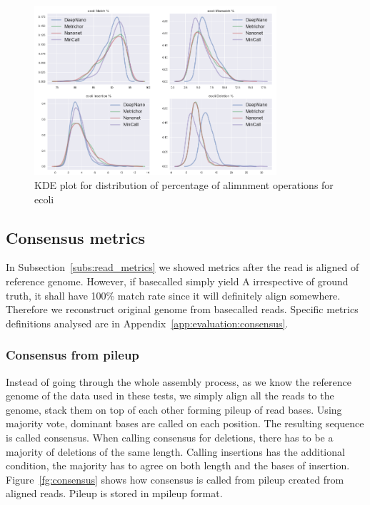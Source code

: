 \documentclass[runningheads,a4paper]{llncs}
\begin{document}
\begin{figure}[]
	\begin{center}
		\includegraphics[width=0.8\textwidth]{./imgs/results/ecoli/kde_cigar.png}
		\caption{KDE plot for distribution of percentage of alimnment operations for ecoli}
		\label{fg:ecoli_kde}
	\end{center}
\end{figure}


\subsection{Consensus metrics}

In Subsection~\ref{subs:read_metrics} we showed metrics after the read is aligned of reference genome. However, if basecalled simply yield A irrespective of ground truth, it shall have 100\% match rate since it will definitely align somewhere. Therefore we reconstruct original genome from basecalled reads. Specific metrics definitions analysed are in Appendix~\ref{app:evaluation:consensus}.

\subsubsection{Consensus from pileup}

Instead of going through the whole assembly process, as we know the reference genome of the data used in these tests, we simply align all the reads to the genome, stack them on top of each other forming pileup of read bases. Using majority vote, dominant bases are called on each position. The resulting sequence is called consensus. When calling consensus for deletions,  there has to be a majority of deletions of the same length. Calling insertions has the additional condition, the majority has to agree on both length and the bases of insertion. Figure~\ref{fg:consensus} shows how consensus is called from pileup created from aligned reads. Pileup is stored in mpileup format.
\end{document}
